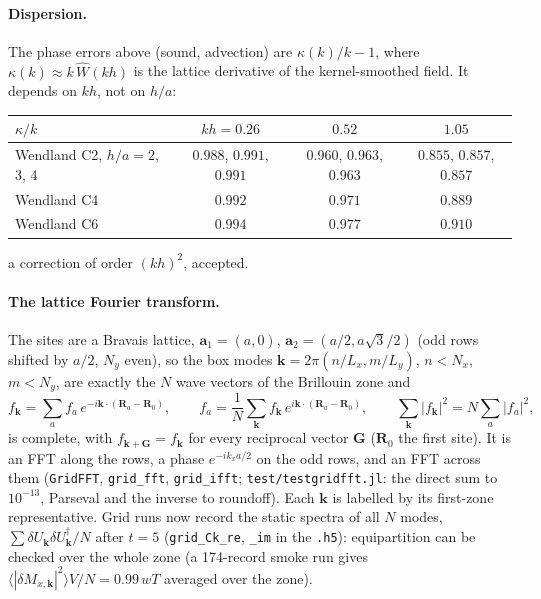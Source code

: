 \documentclass[11pt,aps,preprint,nofootinbib,superscriptaddress,tightenlines]{revtex4-2}
\def\st{\begin{equation}}
\def\stp{\end{equation}}
\let\oldparagraph\paragraph
\renewcommand{\paragraph}{\par\bigskip\oldparagraph}
\begin{document}
\paragraph{Dispersion.}  The phase errors above (sound, advection) are $\kappa(k)/k-1$, where
$\kappa(k)\approx k\,\hat W(kh)$ is the lattice derivative of the kernel-smoothed field.  It depends on $kh$, not
on $h/a$:
\begin{center}
\begin{tabular}{lccc}
\hline
$\kappa/k$ & $kh=0.26$ & $0.52$ & $1.05$ \\ \hline
Wendland C2, $h/a=2$, $3$, $4$ & $0.988$, $0.991$, $0.991$ & $0.960$, $0.963$, $0.963$ & $0.855$, $0.857$, $0.857$ \\
Wendland C4 & $0.992$ & $0.971$ & $0.889$ \\
Wendland C6 & $0.994$ & $0.977$ & $0.910$ \\
\hline
\end{tabular}
\end{center}
a correction of order $(kh)^2$, accepted.

\paragraph{The lattice Fourier transform.}  The sites are a Bravais lattice, $\bm a_1=(a,0)$, $\bm a_2=(a/2,a\sqrt3/2)$
(odd rows shifted by $a/2$, $N_y$ even), so the box modes $\bm k=2\pi(n/L_x,m/L_y)$, $n<N_x$, $m<N_y$, are exactly the
$N$ wave vectors of the Brillouin zone and
\st
f_{\bm k}=\sum_af_a\,e^{-i\bm k\cdot(\bm R_a-\bm R_0)},\qquad f_a=\frac1N\sum_{\bm k}f_{\bm k}\,e^{i\bm k\cdot(\bm R_a-\bm R_0)},\qquad
\sum_{\bm k}|f_{\bm k}|^2=N\sum_a|f_a|^2,
\stp
is complete, with $f_{\bm k+\bm G}=f_{\bm k}$ for every reciprocal vector $\bm G$ ($\bm R_0$ the first site).  It is an
FFT along the rows, a phase $e^{-ik_xa/2}$ on the odd rows, and an FFT across them (\texttt{GridFFT},
\texttt{grid\_fft}, \texttt{grid\_ifft}; \texttt{test/testgridfft.jl}: the direct sum to $10^{-13}$, Parseval and the
inverse to roundoff).  Each $\bm k$ is labelled by its first-zone representative.  Grid runs now record the
static spectra of all $N$ modes, $\sum\delta U_{\bm k}\delta U_{\bm k}^\dagger/N$ after $t=5$ (\texttt{grid\_Ck\_re}, \texttt{\_im} in the
\texttt{.h5}): equipartition can be checked over the whole zone (a 174-record smoke run gives
$\langle|\delta M_{x,\bm k}|^2\rangle V/N=0.99\,wT$ averaged over the zone).
\end{document}
